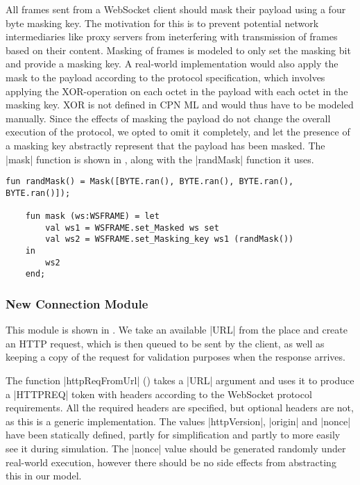 	All frames sent from a WebSocket client should mask their payload using a four
	byte masking key.
	The motivation for this is to prevent potential network intermediaries like proxy
	servers from ineterfering with transmission of frames based on their content.
	Masking of frames is modeled to only set the masking bit and provide a
	masking key. A real-world implementation would also apply the mask to the
	payload according to the protocol specification, which involves applying the
	XOR-operation on each octet in the payload with each octet in the masking key.
	XOR is not defined in CPN ML and would thus have to be modeled manually. Since
	the effects of masking the payload do not change the overall execution of the
	protocol, we opted to omit it completely, and let the presence of a masking key
	abstractly represent that the payload has been masked. The |mask| function is
	shown in , along with the |randMask| function it uses.
	
	\begin{lstlisting}[label=lst:mask_fun,caption=Masking functions
	,gobble=1,float=h]
	fun randMask() = Mask([BYTE.ran(), BYTE.ran(), BYTE.ran(), BYTE.ran()]);
  
	fun mask (ws:WSFRAME) = let
		val ws1 = WSFRAME.set_Masked ws set
		val ws2 = WSFRAME.set_Masking_key ws1 (randMask())
	in 
		ws2
	end;
	\end{lstlisting}
     
	\subsubsection{New Connection Module}
		
		
		This module is shown in . We take an available |URL| from the
		 place and create an HTTP request, which is then
		queued to be sent by the client, as well as keeping a copy of the request for
		validation purposes when the response arrives.
		
		The function |httpReqFromUrl| () takes a |URL| argument
		and uses it to produce a |HTTPREQ| token with headers according to the WebSocket
		protocol requirements. 
		All the required headers are specified, but optional headers are not, as this
		is a generic implementation. The values |httpVersion|, |origin| and |nonce|
		have been statically defined, partly for simplification and partly to more
		easily see it during simulation. The |nonce| value should be generated
		randomly under real-world execution, however there should be no side effects
		from abstracting this in our model.

